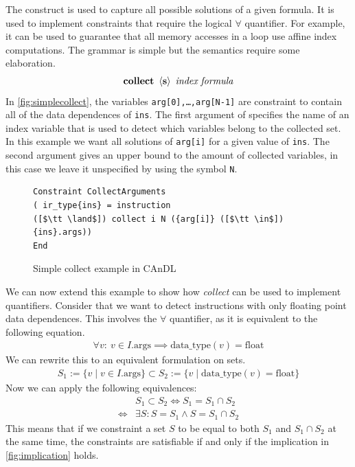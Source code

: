     The  construct is used to capture all possible solutions
    of a given formula.
    It is used to implement constraints that require the logical $\forall$
    quantifier.
    For example, it can be used to guarantee that all memory accesses in a loop
    use affine index computations.
    The grammar is simple but the semantics require some elaboration.
    \begin{align*}
        \text{\bf collect}\ \left<\text{\bf s}\right>\ \text{\it index}\ \text{\it formula}
    \end{align*}
    In \autoref{fig:simplecollect}, the variables \texttt{arg[0],\dots,arg[N-1]}
    are constraint to contain all of the data dependences of \texttt{ins}.
    The first argument of  specifies the name of an index
    variable that is used to detect which variables belong to the collected set.
    In this example we want all solutions of \texttt{arg[i]} for a given value
    of \texttt{ins}.
    The second argument gives an upper bound to the amount of collected
    variables, in this case we leave it unspecified by using the symbol
    \texttt{N}.

\begin{figure}[ht]
\begin{lstlisting}[language=CAnDL]
Constraint CollectArguments
( ir_type{ins} = instruction
([$\tt \land$]) collect i N ({arg[i]} ([$\tt \in$]) {ins}.args))
End
\end{lstlisting}
\vspace{-0.3cm}
\caption{Simple collect example in CAnDL}
\label{fig:simplecollect}
\end{figure}

    We can now extend this example to show how {\it collect} can be used to
    implement quantifiers.
    Consider that we want to detect instructions with only floating point data
    dependences.
    This involves the $\forall$ quantifier, as it is equivalent to
    the following equation.
    \begin{align}
        \forall v\colon\ v\in I.\text{args}\implies\text{data\_type}(v)=\text{float}
    \label{fig:implication}
    \end{align}
    We can rewrite this to an equivalent formulation on sets.
    \begin{align*}
        S_1:= \{v\mid v\in I.\text{args}\}\subset S_2:={}\{v\mid\text{data\_type}(v)=\text{float}\}
    \end{align*}
    Now we can apply the following equivalences:
    \begin{align*}
        &S_1\subset S_2\Leftrightarrow{}S_1 = S_1\cap S_2\\
        \Leftrightarrow{}&\exists S\colon S=S_1\land S=S_1\cap S_2
    \end{align*}
    This means that if we constraint a set $S$ to be equal to both $S_1$ and
    $S_1\cap S_2$ at the same time, the constraints are satisfiable if and only
    if the implication in \autoref{fig:implication} holds.

